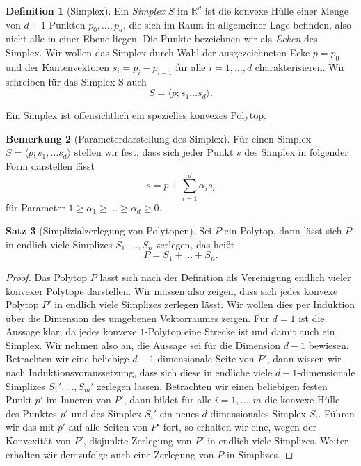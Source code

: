 \documentclass[11pt,titlepage]{article}
\newcommand{\setR}{\mathbb{R}}
\theoremstyle{definition}
\newtheorem{theorem}{Satz}[section]
\newtheorem{definition}[theorem]{Definition}
\newtheorem{remark}[theorem]{Bemerkung}
\theoremstyle{remark}
\begin{document}
	\begin{definition}[Simplex]\label{def:simplex}
		Ein \textsl{Simplex} $S$ im $\setR^d$ ist die konvexe Hülle einer Menge von 
		$d+1$ Punkten 
		$p_0,\ldots,p_d$, die sich im Raum in allgemeiner Lage befinden, also 
		nicht alle in einer Ebene liegen. Die Punkte bezeichnen wir als 
		\textsl{Ecken} des Simplex. Wir wollen das Simplex durch Wahl der 
		ausgezeichneten Ecke $p=p_0$ und der Kantenvektoren 
		$s_i=p_i -p_{i-1}$ für alle $i=1,\ldots,d$ charakterisieren. 
		Wir schreiben für das Simplex S auch
		\[S=\langle p;s_1\ldots s_d\rangle.\]
	\end{definition}
	
	Ein Simplex ist offensichtlich ein spezielles konvexes Polytop. 
	
	\begin{remark}[Parameterdarstellung des Simplex]\label{bem:paradarst;simplex}
		Für einen Simplex $S=\langle p;s_1,\ldots s_d\rangle$ stellen wir 
		fest, dass sich jeder Punkt $s$ des Simplex in folgender Form darstellen 
		lässt
		\[s=p+\sum_{i=1}^d \alpha_i s_i\]
		für Parameter $1\geq \alpha_1\geq\ldots\geq\alpha_d\geq 0$. 
	\end{remark}
	
	\begin{theorem}[Simplizialzerlegung von Polytopen]\label{thm:simplzerl}
		Sei $P$ ein Polytop, dann lässt sich $P$ in endlich viele 
		Simplizes $S_1,\ldots,S_n$ zerlegen, das heißt
		\[P=S_1+\ldots+S_n.\]
	\end{theorem}
	
	\begin{proof}
		Das Polytop $P$ lässt sich nach der Definition als Vereinigung endlich 
		vieler konvexer Polytope darstellen. Wir müssen also 
		zeigen, dass sich jedes konvexe Polytop $P'$ in endlich viele Simplizes 
		zerlegen lässt. Wir wollen dies per Induktion über die Dimension 
		des umgebenen Vektorraumes zeigen. Für $d=1$ ist die Aussage klar, da 
		jedes konvexe $1$-Polytop eine Strecke ist und damit auch ein 
		Simplex. Wir nehmen also an, die Aussage sei für die Dimension $d-1$ 
		bewiesen. Betrachten wir eine beliebige $d-1$-dimensionale Seite von 
		$P'$, dann wissen wir nach Induktionsvoraussetzung, dass sich diese  
		in endliche viele $d-1$-dimensionale Simplizes $S_1',\ldots,S_m'$ 
		zerlegen lassen. 
		Betrachten wir einen beliebigen festen Punkt $p'$ im Inneren von $P'$, dann 
		bildet für alle $i=1,\ldots,m$ die konvexe Hülle des Punktes $p'$ und 
		des Simplex $S_i'$ ein 
		neues $d$-dimensionales Simplex $S_i$. Führen wir das mit $p'$ auf 
		alle Seiten 
		von $P'$ fort, so erhalten wir eine, wegen der Konvexität 
		von $P'$, disjunkte 
		Zerlegung von $P'$ in endlich viele 
		Simplizes. Weiter erhalten wir demzufolge auch eine Zerlegung von 
		$P$ in Simplizes.
	\end{proof}
	
\end{document}
